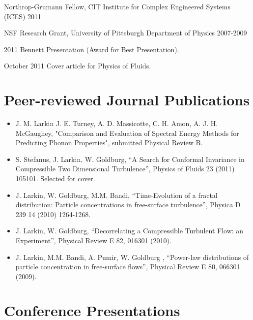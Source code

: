 \documentclass[letterpaper,12pt]{article}
\begin{document}
Northrop-Grumann Fellow, CIT Institute for Complex Engineered Systems (ICES) 2011

NSF Research Grant, University of Pittsburgh Department of Physics 2007-2009

2011 Bennett Presentation (Award for Best Presentation).

October 2011 Cover article for Physics of Fluids.

\section*{Peer-reviewed Journal Publications}

\begin{itemize}

\item J. M. Larkin J. E. Turney, A. D. Massicotte, C. H. Amon, A. J. H. McGaughey, "Comparison and Evaluation of Spectral Energy Methods for Predicting Phonon Properties", submitted Physical Review B.

\item S. Stefanus, J. Larkin, W. Goldburg, “A Search for Conformal Invariance in Compressible Two
Dimensional Turbulence”, Physics of Fluids 23 (2011) 105101. Selected for cover.

\item J. Larkin, W. Goldburg, M.M. Bandi, “Time-Evolution of a fractal distribution: Particle concentrations
in free-surface turbulence”, Physica D 239 14 (2010) 1264-1268.

\item J. Larkin, W. Goldburg, “Decorrelating a Compressible Turbulent Flow: an Experiment”, Physical Review E
82, 016301 (2010).

\item J. Larkin, M.M. Bandi, A. Pumir, W. Goldburg , “Power-law distributions of particle concentration in
free-surface flows”, Physical Review E 80, 066301 (2009).

\end{itemize}

\section*{Conference Presentations}
\end{document}
